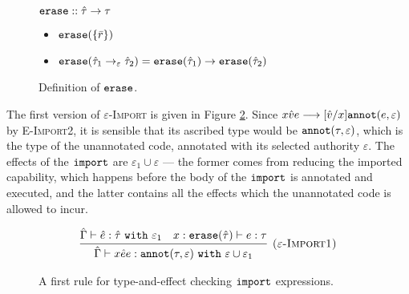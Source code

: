 \begin{figure}[h]
\vspace{-5pt}

$\mathtt{erase} :: \hat \tau \rightarrow \tau$
\begin{itemize}
	\setlength\itemsep{-0.2em}
	\item[] $\mathtt{erase}(\{ \bar r \})$
	\item[] $\mathtt{erase}(\hat \tau_1 \rightarrow_{\varepsilon} \hat \tau_2) = \mathtt{erase}(\hat \tau_1) \rightarrow \mathtt{erase}(\hat \tau_2)$
\end{itemize}

\vspace{-7pt}
\caption{Definition of $\mathtt{erase}$.}
\label{fig:erase_defn}
\end{figure}

The first version of \textsc{$\varepsilon$-Import} is given in Figure \ref{fig:import_rule_1}. Since ${x}{\hat v}{e} \longrightarrow [\hat v/x]\mathtt{annot}(e, \varepsilon)$ by \textsc{E-Import2}, it is sensible that its ascribed type would be $\mathtt{annot}(\tau, \varepsilon)$, which is the type of the unannotated code, annotated with its selected authority $\varepsilon$. The effects of the $\mathtt{import}$ are $\varepsilon_1 \cup \varepsilon$ --- the former comes from reducing the imported capability, which happens before the body of the $\mathtt{import}$ is annotated and executed, and the latter contains all the effects which the unannotated code is allowed to incur. 


\begin{figure}[h]

\[
\begin{array}{c}

\infer[\textsc{($\varepsilon$-Import1)}]
	{ \hat \Gamma \vdash {x}{\hat e}{e}: \kwa{annot}(\tau, \varepsilon)~\kw{with} \varepsilon \cup \varepsilon_1 }
	{ \hat \Gamma \vdash \hat e: \hat \tau~\kw{with} \varepsilon_1 & x: \kwa{erase}(\hat \tau) \vdash e: \tau }

\end{array}
\]
\vspace{-7pt}
\caption{A first rule for type-and-effect checking $\mathtt{import}$ expressions.}
\label{fig:import_rule_1}
\end{figure}

